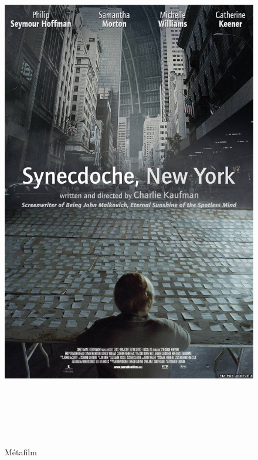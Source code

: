 \begin{frame}[fragile]
\begin{columns}

\begin{figure}[htbp]
\centering
\includegraphics[height=1.30000\textwidth]{synecdoche}
\caption{Métafilm}
\end{figure}

\end{columns}

\end{frame}
